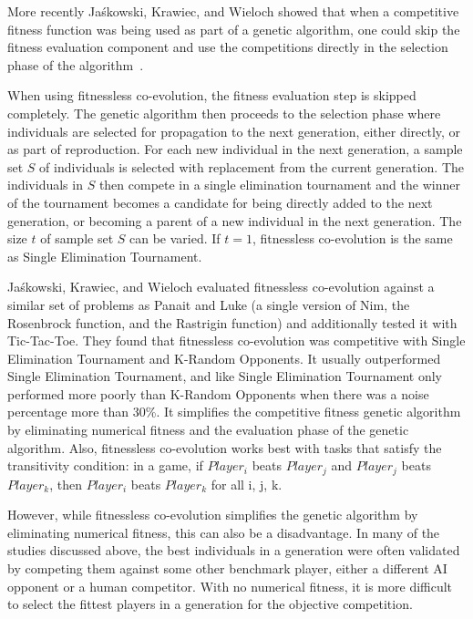 More recently Ja\'{s}kowski, Krawiec, and Wieloch showed that when a
competitive fitness function was being used as part of a genetic algorithm, one
could skip the fitness evaluation component and use the competitions directly in the
selection phase of the algorithm~\cite{Jaskowski:2008:FC:1389095.1389161}. 

When using fitnessless co-evolution, the fitness evaluation step is skipped
completely. The genetic algorithm then proceeds to the selection phase where
individuals are selected for propagation to the next generation, either
directly, or as part of reproduction. For each new individual in the next
generation, a sample set \(S\) of individuals is selected with replacement from
the current generation. The individuals in \(S\) then compete in a single
elimination tournament and the winner of the tournament becomes a candidate for
being directly added to the next generation, or becoming a parent of a new
individual in the next generation. The size \(t\) of sample set \(S\) can be
varied. If \(t=1\), fitnessless co-evolution is the same as Single
Elimination Tournament.

Ja\'{s}kowski, Krawiec, and Wieloch evaluated fitnessless co-evolution against a
similar set of problems as Panait and Luke (a single version of Nim, the
Rosenbrock function, and the Rastrigin function) and additionally tested it with
Tic-Tac-Toe. They found that fitnessless co-evolution was competitive with Single
Elimination Tournament and K-Random Opponents. It usually outperformed Single
Elimination Tournament, and like Single Elimination Tournament only performed
more poorly than K-Random Opponents when there was a noise percentage more than
30\%. It simplifies the competitive fitness genetic algorithm by eliminating
numerical fitness and the evaluation phase of the genetic algorithm. Also,
fitnessless co-evolution works best with tasks that satisfy the transitivity
condition: in a game, if \(Player_{i}\) beats \(Player_{j}\) and \(Player_{j}\)
beats \(Player_{k}\), then \(Player_{i}\) beats \(Player_{k}\) for all i, j, k.

However, while fitnessless co-evolution simplifies the genetic algorithm by
eliminating numerical fitness, this can also be a disadvantage. In many of the
studies discussed above, the best individuals in a generation were often
validated by competing them against some other benchmark player, either a
different AI opponent or a human competitor. With no numerical fitness, it is
more difficult to select the fittest players in a generation for the objective
competition.

